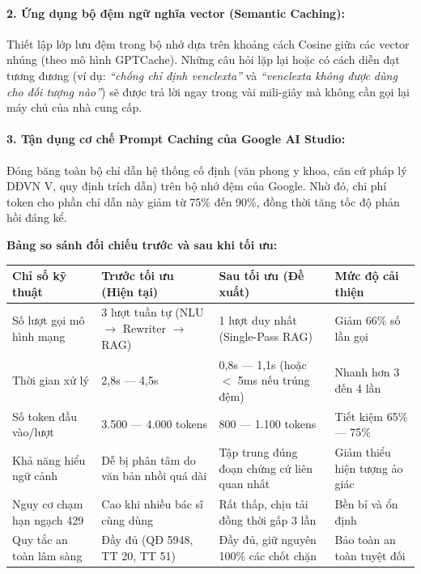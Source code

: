\documentclass[12pt,a4paper]{article}
\begin{document}
\paragraph{2. Ứng dụng bộ đệm ngữ nghĩa vector (Semantic Caching):}
Thiết lập lớp lưu đệm trong bộ nhớ dựa trên khoảng cách Cosine giữa các vector nhúng (theo mô hình GPTCache). Những câu hỏi lặp lại hoặc có cách diễn đạt tương đương (ví dụ: \textit{``chống chỉ định venclexta''} và \textit{``venclexta không được dùng cho đối tượng nào''}) sẽ được trả lời ngay trong vài mili-giây mà không cần gọi lại máy chủ của nhà cung cấp.

\paragraph{3. Tận dụng cơ chế Prompt Caching của Google AI Studio:}
Đóng băng toàn bộ chỉ dẫn hệ thống cố định (văn phong y khoa, căn cứ pháp lý DĐVN V, quy định trích dẫn) trên bộ nhớ đệm của Google. Nhờ đó, chi phí token cho phần chỉ dẫn này giảm từ 75\% đến 90\%, đồng thời tăng tốc độ phản hồi đáng kể.

\vspace{0.8em}
\noindent \textbf{Bảng so sánh đối chiếu trước và sau khi tối ưu:}
\vspace{0.4em}

\begin{table}[htbp]
\centering
\small
\begin{tabularx}{\textwidth}{L{3.2cm} L{3.8cm} L{4.5cm} Y}
\toprule
\textbf{Chỉ số kỹ thuật} & \textbf{Trước tối ưu (Hiện tại)} & \textbf{Sau tối ưu (Đề xuất)} & \textbf{Mức độ cải thiện} \\
\midrule
Số lượt gọi mô hình mạng & 3 lượt tuần tự (NLU $\rightarrow$ Rewriter $\rightarrow$ RAG) & 1 lượt duy nhất (Single-Pass RAG) & Giảm 66\% số lần gọi \\
Thời gian xử lý & 2,8s --- 4,5s & 0,8s --- 1,1s (hoặc $<$ 5ms nếu trúng đệm) & Nhanh hơn 3 đến 4 lần \\
Số token đầu vào/lượt & 3.500 --- 4.000 tokens & 800 --- 1.100 tokens & Tiết kiệm 65\% --- 75\% \\
Khả năng hiểu ngữ cảnh & Dễ bị phân tâm do văn bản nhồi quá dài & Tập trung đúng đoạn chứng cứ liên quan nhất & Giảm thiểu hiện tượng ảo giác \\
Nguy cơ chạm hạn ngạch 429 & Cao khi nhiều bác sĩ cùng dùng & Rất thấp, chịu tải đồng thời gấp 3 lần & Bền bỉ và ổn định \\
Quy tắc an toàn lâm sàng & Đầy đủ (QĐ 5948, TT 20, TT 51) & Đầy đủ, giữ nguyên 100\% các chốt chặn & Bảo toàn an toàn tuyệt đối \\
\bottomrule
\end{tabularx}
\end{table}
\end{document}
